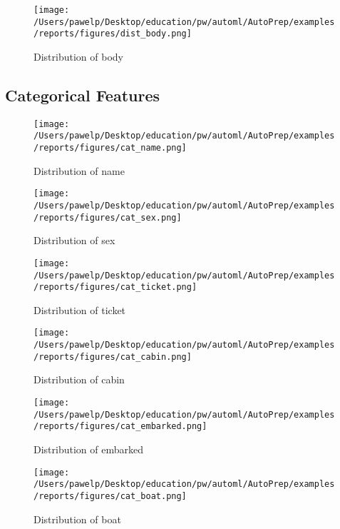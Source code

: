 \documentclass{article}%
\begin{document}
%


\begin{figure}[H]%
\centering%
\texttt{[image: /Users/pawelp/Desktop/education/pw/automl/AutoPrep/examples/reports/figures/dist\_body.png]}%
\caption{Distribution of body}%
\end{figure}

%
\subsection{Categorical Features}%
\label{subsec:CategoricalFeatures}%

%


\begin{figure}[H]%
\centering%
\texttt{[image: /Users/pawelp/Desktop/education/pw/automl/AutoPrep/examples/reports/figures/cat\_name.png]}%
\caption{Distribution of name}%
\end{figure}

%


\begin{figure}[H]%
\centering%
\texttt{[image: /Users/pawelp/Desktop/education/pw/automl/AutoPrep/examples/reports/figures/cat\_sex.png]}%
\caption{Distribution of sex}%
\end{figure}

%


\begin{figure}[H]%
\centering%
\texttt{[image: /Users/pawelp/Desktop/education/pw/automl/AutoPrep/examples/reports/figures/cat\_ticket.png]}%
\caption{Distribution of ticket}%
\end{figure}

%


\begin{figure}[H]%
\centering%
\texttt{[image: /Users/pawelp/Desktop/education/pw/automl/AutoPrep/examples/reports/figures/cat\_cabin.png]}%
\caption{Distribution of cabin}%
\end{figure}

%


\begin{figure}[H]%
\centering%
\texttt{[image: /Users/pawelp/Desktop/education/pw/automl/AutoPrep/examples/reports/figures/cat\_embarked.png]}%
\caption{Distribution of embarked}%
\end{figure}

%


\begin{figure}[H]%
\centering%
\texttt{[image: /Users/pawelp/Desktop/education/pw/automl/AutoPrep/examples/reports/figures/cat\_boat.png]}%
\caption{Distribution of boat}%
\end{figure}
\end{document}
